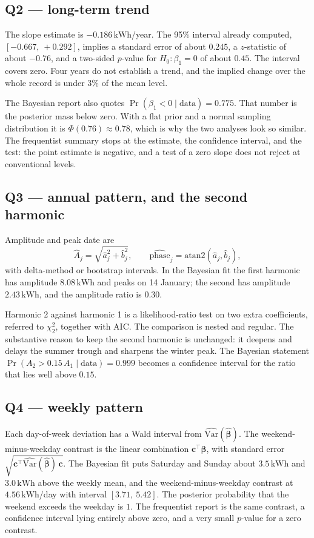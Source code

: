 \documentclass[11pt]{article}
\newcommand{\kwh}{\,\mathrm{kWh}}
\begin{document}
\subsection{Q2 --- long-term trend}

The slope estimate is $-0.186\kwh$/year. The 95\% interval already computed,
$[-0.667,\ +0.292]$, implies a standard error of about $0.245$, a $z$-statistic
of about $-0.76$, and a two-sided $p$-value for $H_0:\beta_1 = 0$ of about
$0.45$. The interval covers zero. Four years do not establish a trend, and the
implied change over the whole record is under $3\%$ of the mean level.

The Bayesian report also quotes
$\Pr(\beta_1 < 0 \mid \mathrm{data}) = 0.775$. That number is the posterior
mass below zero. With a flat prior and a normal sampling distribution it is
$\Phi(0.76) \approx 0.78$, which is why the two analyses look so similar. The
frequentist summary stops at the estimate, the confidence interval, and the
test: the point estimate is negative, and a test of a zero slope does not
reject at conventional levels.

\subsection{Q3 --- annual pattern, and the second harmonic}

Amplitude and peak date are
\[
\hat A_j = \sqrt{\hat a_j^2 + \hat b_j^2},
\qquad
\widehat{\mathrm{phase}}_j = \mathrm{atan2}(\hat a_j,\hat b_j),
\]
with delta-method or bootstrap intervals. In the Bayesian fit the first
harmonic has amplitude $8.08\kwh$ and peaks on 14 January; the second has
amplitude $2.43\kwh$, and the amplitude ratio is $0.30$.

Harmonic 2 against harmonic 1 is a likelihood-ratio test on two extra
coefficients, referred to $\chi^2_2$, together with AIC. The comparison is
nested and regular. The substantive reason to keep the second harmonic is
unchanged: it deepens and delays the summer trough and sharpens the winter
peak. The Bayesian statement
$\Pr(A_2 > 0.15\,A_1 \mid \mathrm{data}) = 0.999$
becomes a confidence interval for the ratio that lies well above $0.15$.

\subsection{Q4 --- weekly pattern}

Each day-of-week deviation has a Wald interval from
$\widehat{\mathrm{Var}}(\hat{\boldsymbol\beta})$. The weekend-minus-weekday
contrast is the linear combination $\mathbf{c}^{\top}\hat{\boldsymbol\beta}$,
with standard error
$\sqrt{\mathbf{c}^{\top}\widehat{\mathrm{Var}}(\hat{\boldsymbol\beta})\,\mathbf{c}}$.
The Bayesian fit puts Saturday and Sunday about $3.5\kwh$ and $3.0\kwh$ above
the weekly mean, and the weekend-minus-weekday contrast at $4.56\kwh$/day
with interval $[3.71,\ 5.42]$. The posterior probability that the weekend
exceeds the weekday is $1$. The frequentist report is the same contrast, a
confidence interval lying entirely above zero, and a very small $p$-value for
a zero contrast.
\end{document}
